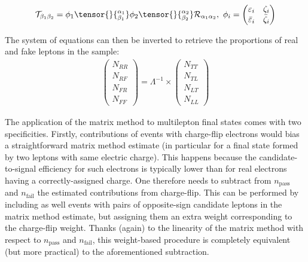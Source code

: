 \begin{align}
\mathcal{T}_{\beta_1 \beta_2} = 
\phi_1\tensor{\vphantom{\phi}}{_{\beta_1}^{\alpha_1}} 
\phi_2\tensor{\vphantom{\phi}}{_{\beta_2}^{\alpha_2}}
\mathcal{R}_{\alpha_1 \alpha_2},~
\phi_i = 
 \begin{pmatrix}\varepsilon_i & \zeta_i\\ \bar\varepsilon_i & \bar\zeta_i\end{pmatrix}
\label{eq:fake.tensor_compact}
\end{align}

 The system of equations can then be inverted to retrieve the proportions of real and fake leptons in the sample:
\begin{align}
\left(\begin{array}{c}
N_{RR} \\  N_{RF} \\ N_{FR} \\ N_{FF}
\end{array}\right) =
\Lambda^{-1} \times 
\left(\begin{array}{c}
N_{TT} \\  N_{TL} \\ N_{LT} \\ N_{LL}
\end{array}\right)
\label{eq:mxm_inverted}
\end{align}



The application of the matrix method to multilepton final states comes with two specificities. Firstly, contributions of events with charge-flip electrons would bias a straightforward matrix method estimate (in particular for a final state formed by two leptons with same electric charge). This happens because the candidate-to-signal efficiency for such electrons is typically lower than for real electrons having a correctly-assigned charge. One therefore needs to subtract from $n_\text{pass}$ and $n_\text{fail}$ the estimated contributions from charge-flip. This can be performed by including as well events with pairs of opposite-sign candidate leptons in the matrix method estimate, but assigning them an extra weight corresponding to the charge-flip weight. Thanks (again) to the linearity of the matrix method with respect to $n_\text{pass}$ and $n_\text{fail}$, this weight-based procedure is completely equivalent (but more practical) to the aforementioned subtraction. 

